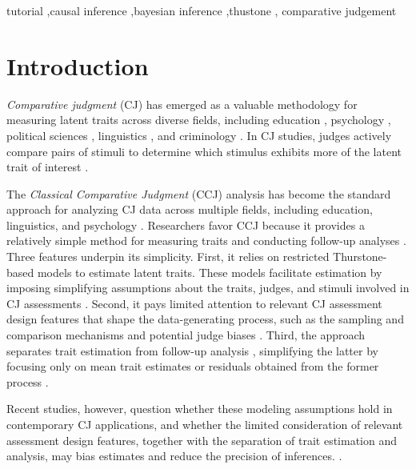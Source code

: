 \documentclass[
  authoryear,
  review,
  1p]{elsarticle}
\begin{document}
\begin{frontmatter}
\begin{keyword}
    tutorial \sep causal inference \sep bayesian
inference \sep thustone \sep 
    comparative judgement
\end{keyword}
\end{frontmatter}
    

\newcommand{\dsep}{\:\bot\:}
\newcommand{\ndsep}{\:\not\bot\:}

\section{Introduction}\label{sec-introduction}

\emph{Comparative judgment} (CJ) has emerged as a valuable methodology
for measuring latent traits across diverse fields, including education
\citep{Kimbell_2012, Jones_et_al_2015, vanDaal_et_al_2016, Bartholomew_et_al_2018},
psychology \citep{Maydeu-Olivares_et_al_2005}, political sciences
\citep{Zucco_et_al_2019}, linguistics \citep{Boonen_et_al_2020}, and
criminology \citep{Seymour_et_al_2022, Seymour_et_al_2025}. In CJ
studies, judges actively compare pairs of stimuli to determine which
stimulus exhibits more of the latent trait of interest
\citep{Thurstone_1927a, Thurstone_1927b}.

The \emph{Classical Comparative Judgment} (CCJ) analysis has become the
standard approach for analyzing CJ data across multiple fields,
including education, linguistics, and psychology \citep[see, for
example,][]{Wu_2025, Thwaites_et_al_2024, Maydeu-Olivares_et_al_2005}.
Researchers favor CCJ because it provides a relatively simple method for
measuring traits and conducting follow-up analyses
\citep{Andrich_1978, Pollitt_2012b}. Three features underpin its
simplicity. First, it relies on restricted Thurstone-based models to
estimate latent traits. These models facilitate estimation by imposing
simplifying assumptions about the traits, judges, and stimuli involved
in CJ assessments \citep{Thurstone_1927b, Bramley_2008}. Second, it pays
limited attention to relevant CJ assessment design features that shape
the data-generating process, such as the sampling and comparison
mechanisms and potential judge biases \citep{Rivera_et_al_2025}. Third,
the approach separates trait estimation from follow-up analysis
\citep{Pollitt_2012b}, simplifying the latter by focusing only on mean
trait estimates or residuals obtained from the former process
\citep{Rivera_et_al_2025}.

Recent studies, however, question whether these modeling assumptions
hold in contemporary CJ applications, and whether the limited
consideration of relevant assessment design features, together with the
separation of trait estimation and analysis, may bias estimates and
reduce the precision of inferences.
\citep{Bramley_2008, Kelly_et_al_2022, Rivera_et_al_2025}.
\end{document}
